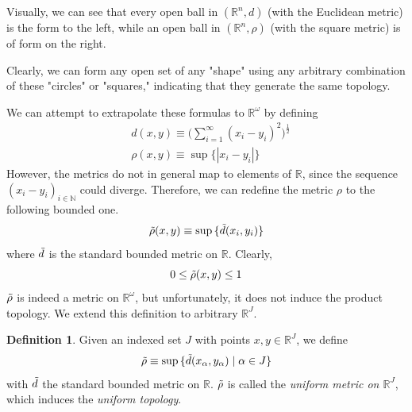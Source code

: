 \documentclass{article}
\theoremstyle{remark}
\theoremstyle{definition}
\newtheorem{definition}{Definition}[section]
\begin{document}
Visually, we can see that every open ball in $(\mathbb{R}^n, d)$ (with the Euclidean metric) is the form to the left, while an open ball in $(\mathbb{R}^n, \rho)$ (with the square metric) is of form on the right. 
\begin{center}
\end{center}
Clearly, we can form any open set of any "shape" using any arbitrary combination of these "circles" or "squares," indicating that they generate the same topology. 

We can attempt to extrapolate these formulas to $\mathbb{R}^\omega$ by defining
\begin{align*}
    & d(x, y) \equiv \bigg(\sum_{i=1}^\infty (x_i - y_i)^2 \bigg)^{\frac{1}{2}} \\
    & \rho(x, y) \equiv \sup{\{|x_i - y_i|\}}
\end{align*}
However, the metrics do not in general map to elements of $\mathbb{R}$, since the sequence $(x_i - y_i)_{i \in \mathbb{N}}$ could diverge. Therefore, we can redefine the metric $\rho$ to the following bounded one. 
\[\Tilde{\rho} (x, y) \equiv \sup{\{\Tilde{d}(x_i, y_i)\}}\]
where $\Tilde{d}$ is the standard bounded metric on $\mathbb{R}$. Clearly,
\[0 \leq \Tilde{\rho}(x, y) \leq 1\]
$\Tilde{\rho}$ is indeed a metric on $\mathbb{R}^\omega$, but unfortunately, it does not induce the product topology. We extend this definition to arbitrary $\mathbb{R}^J$. 

\begin{definition}
Given an indexed set $J$ with points $x, y \in \mathbb{R}^J$, we define
\[\Tilde{\rho} \equiv \sup{\{\Tilde{d}(x_\alpha, y_\alpha)\;|\; \alpha \in J\}}\]
with $\Tilde{d}$ the standard bounded metric on $\mathbb{R}$. $\Tilde{\rho}$ is called the \textit{uniform metric on $\mathbb{R}^J$}, which induces the \textit{uniform topology}. 
\end{definition}
\end{document}
